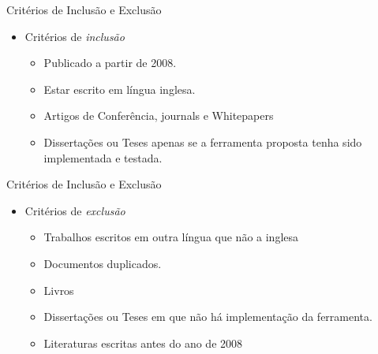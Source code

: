 \documentclass[t,14pt,mathserif]{beamer}
\begin{document}
\begin{frame}{Critérios de Inclusão e Exclusão}
    \begin{itemize}
      \item Critérios de \textit{inclusão}
              \begin{itemize}

                   \item Publicado a partir de 2008.
                   \item Estar escrito em língua inglesa.
                   \item Artigos de Conferência, journals e Whitepapers
                   \item Dissertações ou Teses apenas se a ferramenta proposta tenha sido
  implementada e testada.
              \end{itemize}
    \end{itemize}
\end{frame}
\begin{frame}{Critérios de Inclusão e Exclusão}
    \begin{itemize}
      \item Critérios de \textit{exclusão}
               \begin{itemize}
                       \item Trabalhos escritos em outra língua que não a inglesa
                       \item Documentos duplicados.
                       \item Livros
                       \item Dissertações ou Teses em que não há implementação da ferramenta.
                       \item Literaturas escritas antes do ano de 2008
              \end{itemize}
      \end{itemize}
\end{frame}
\end{document}
